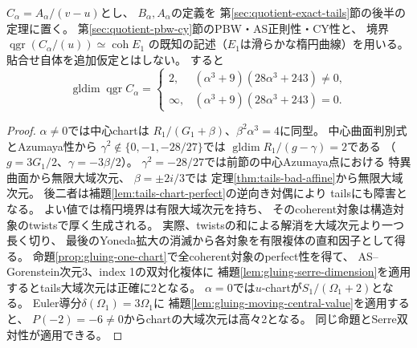 \begin{proposition}
\label{prop:tails-surface-discriminant}
$C_\alpha=A_\alpha/(v-u)$とし、
$B_\alpha,A_\alpha$の定義を
第\ref{sec:quotient-exact-tails}節の後半の定理に置く。
第\ref{sec:quotient-pbw-cy}節のPBW・AS正則性・CY性と、
境界$\operatorname{qgr}(C_\alpha/(u))\simeq\operatorname{coh}E_1$
の既知の記述（$E_1$は滑らかな楕円曲線）を用いる。
貼合せ自体を追加仮定とはしない。
すると
\[
 \operatorname{gldim}\operatorname{qgr}C_\alpha=
 \begin{cases}2,&(\alpha^3+9)(28\alpha^3+243)\ne0,\\
 \infty,&(\alpha^3+9)(28\alpha^3+243)=0.\end{cases}
\]
\end{proposition}
\begin{proof}
$\alpha\ne0$では中心chartは
$R_1/(G_1+\beta)$、$\beta^2\alpha^3=4$に同型。
中心曲面判別式とAzumaya性から
$\gamma^2\notin\{0,-1,-28/27\}$では
$\operatorname{gldim}R_1/(g-\gamma)=2$である
（$g=3G_1/2$、$\gamma=-3\beta/2$）。
$\gamma^2=-28/27$では前節の中心Azumaya点における
特異曲面から無限大域次元、
$\beta=\pm2i/3$では
定理\ref{thm:tails-bad-affine}から無限大域次元。
後二者は補題\ref{lem:tails-chart-perfect}の逆向き対偶により
tailsにも障害となる。
よい値では楕円境界は有限大域次元を持ち、
そのcoherent対象は構造対象のtwistsで厚く生成される。
実際、twistsの和による解消を大域次元より一つ長く切り、
最後のYoneda拡大の消滅から各対象を有限複体の直和因子として得る。
命題\ref{prop:gluing-one-chart}で全coherent対象のperfect性を得て、
AS--Gorenstein次元3、index 1の双対化複体に
補題\ref{lem:gluing-serre-dimension}を適用するとtails大域次元は正確に2となる。
$\alpha=0$では$u$-chartが$S_1/(\Omega_1+2)$となる。
Euler導分$\delta(\Omega_1)=3\Omega_1$に
補題\ref{lem:gluing-moving-central-value}を適用すると、
$P(-2)=-6\ne0$からchartの大域次元は高々2となる。
同じ命題とSerre双対性が適用できる。
\end{proof}

